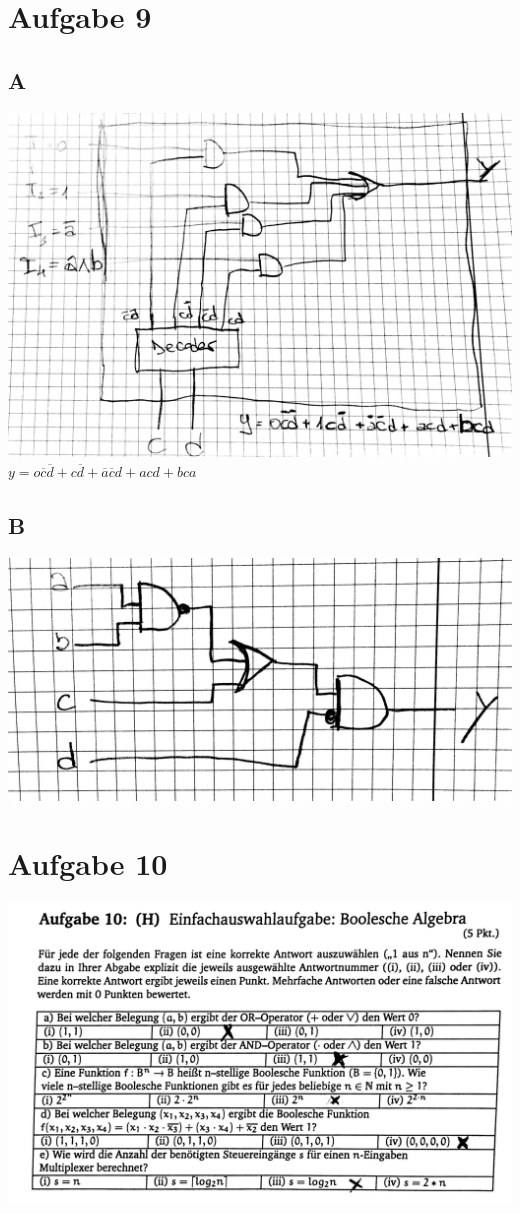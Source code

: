 \documentclass[10pt,a4paper]{article}
\author{Andrea Colarieti}
\begin{document}
\section{Aufgabe 9}
\subsection{A}
\includegraphics[scale=0.2]{ra1_1.jpg} 
$ y = o\overline{c}\overline{d}+c\overline{d}+\overline{a}
\overline{c}d+acd+bca$
\subsection{B}
\includegraphics[scale=0.2]{ra11_1.jpg} 

\newpage
\section{Aufgabe 10}
\includegraphics[scale=0.2]{ra2_1.jpg} 
\end{document}
